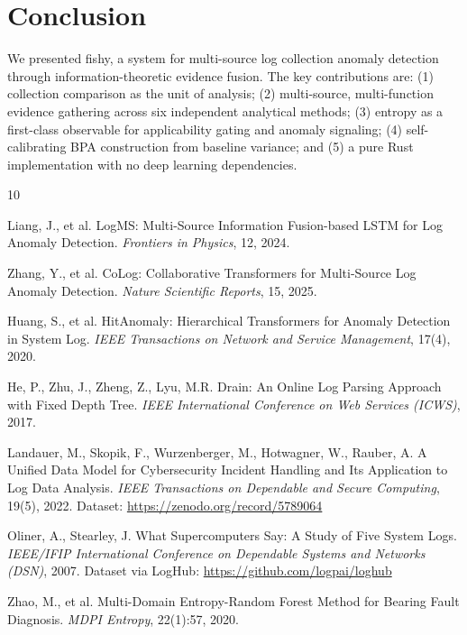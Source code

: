 \documentclass[10pt,twocolumn]{article}
\begin{document}
\section{Conclusion}

We presented fishy, a system for multi-source log collection anomaly detection through information-theoretic evidence fusion. The key contributions are: (1) collection comparison as the unit of analysis; (2) multi-source, multi-function evidence gathering across six independent analytical methods; (3) entropy as a first-class observable for applicability gating and anomaly signaling; (4) self-calibrating BPA construction from baseline variance; and (5) a pure Rust implementation with no deep learning dependencies.

\begin{thebibliography}{10}

Liang, J., et al.
LogMS: Multi-Source Information Fusion-based LSTM for Log Anomaly Detection.
\textit{Frontiers in Physics}, 12, 2024.

Zhang, Y., et al.
CoLog: Collaborative Transformers for Multi-Source Log Anomaly Detection.
\textit{Nature Scientific Reports}, 15, 2025.

Huang, S., et al.
HitAnomaly: Hierarchical Transformers for Anomaly Detection in System Log.
\textit{IEEE Transactions on Network and Service Management}, 17(4), 2020.

He, P., Zhu, J., Zheng, Z., Lyu, M.R.
Drain: An Online Log Parsing Approach with Fixed Depth Tree.
\textit{IEEE International Conference on Web Services (ICWS)}, 2017.

Landauer, M., Skopik, F., Wurzenberger, M., Hotwagner, W., Rauber, A.
A Unified Data Model for Cybersecurity Incident Handling and Its Application to Log Data Analysis.
\textit{IEEE Transactions on Dependable and Secure Computing}, 19(5), 2022.
Dataset: \url{https://zenodo.org/record/5789064}

Oliner, A., Stearley, J.
What Supercomputers Say: A Study of Five System Logs.
\textit{IEEE/IFIP International Conference on Dependable Systems and Networks (DSN)}, 2007.
Dataset via LogHub: \url{https://github.com/logpai/loghub}

Zhao, M., et al.
Multi-Domain Entropy-Random Forest Method for Bearing Fault Diagnosis.
\textit{MDPI Entropy}, 22(1):57, 2020.


\end{thebibliography}
\end{document}
